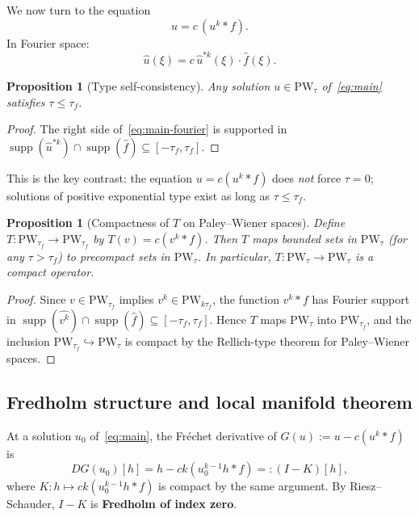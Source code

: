 \documentclass[12pt]{article}
\newtheorem{proposition}[theorem]{Proposition}
\theoremstyle{definition}
\theoremstyle{remark}
\DeclareMathOperator{\supp}{supp}
\newcommand{\PW}{\mathrm{PW}}
\newcommand{\wh}{\widehat}
\begin{document}
We now turn to the equation
\begin{equation}  \label{eq:main}
  u = c\,(u^k\ast f).
\end{equation}
In Fourier space:
\begin{equation}  \label{eq:main-fourier}
  \wh u(\xi) = c\,\wh u^{\ast k}(\xi)\cdot\wh f(\xi).
\end{equation}

\begin{proposition}[Type self-consistency]
  Any solution $u\in\PW_\tau$ of~\eqref{eq:main} satisfies $\tau\leq\tau_f$.
\end{proposition}

\begin{proof}
  The right side of~\eqref{eq:main-fourier} is supported in
  $\supp(\wh u^{\ast k})\cap\supp(\wh f)\subseteq[-\tau_f,\tau_f]$.
\end{proof}

This is the key contrast: the equation $u=c(u^k\ast f)$ does \emph{not}
force $\tau=0$; solutions of positive exponential type exist as long as
$\tau\leq\tau_f$.

\begin{proposition}[Compactness of $T$ on Paley--Wiener spaces]
  \label{prop:T-compact-PW}
  Define $T:\PW_{\tau_f}\to\PW_{\tau_f}$ by $T(v)=c(v^k\ast f)$.  Then
  $T$ maps bounded sets in $\PW_\tau$ (for any $\tau>\tau_f$) to precompact
  sets in $\PW_\tau$.  In particular, $T:\PW_\tau\to\PW_\tau$ is a compact
  operator.
\end{proposition}

\begin{proof}
  Since $v\in\PW_{\tau_f}$ implies $v^k\in\PW_{k\tau_f}$, the function
  $v^k\ast f$ has Fourier support in
  $\supp(\wh{v^k})\cap\supp(\wh f)\subseteq[-\tau_f,\tau_f]$.
  Hence $T$ maps $\PW_\tau$ into $\PW_{\tau_f}$, and the inclusion
  $\PW_{\tau_f}\hookrightarrow\PW_\tau$ is compact by the Rellich-type
  theorem for Paley--Wiener spaces.
\end{proof}

\subsection{Fredholm structure and local manifold theorem}

At a solution $u_0$ of~\eqref{eq:main}, the Fr\'echet derivative of
$G(u):=u-c(u^k\ast f)$ is
\[
  DG(u_0)[h] = h - ck(u_0^{k-1}h\ast f) =: (I-K)[h],
\]
where $K:h\mapsto ck(u_0^{k-1}h\ast f)$ is compact by the same argument.
By Riesz--Schauder, $I-K$ is \textbf{Fredholm of index zero}.
\end{document}
